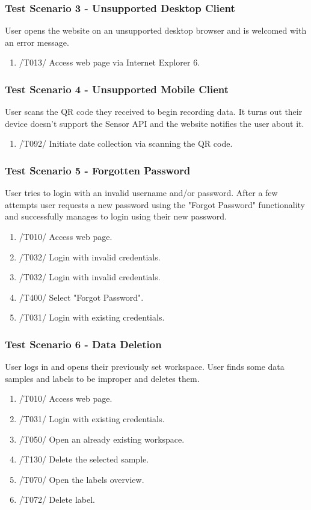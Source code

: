 \subsubsection{Test Scenario 3 - Unsupported Desktop Client}
User opens the website on an unsupported desktop browser and is welcomed with an error message.
\begin{enumerate}
    \item /T013/ Access web page via Internet Explorer 6.
\end{enumerate} 
\subsubsection{Test Scenario 4 - Unsupported Mobile Client}
User scans the QR code they received to begin recording data. It turns out their device doesn't support the Sensor API and the website notifies the user about it.
\begin{enumerate}
    \item /T092/ Initiate date collection via scanning the QR code.
\end{enumerate}
\subsubsection{Test Scenario 5 - Forgotten Password}
User tries to login with an invalid username and/or password. After a few attempts user requests a new password using the "Forgot Password" functionality and successfully manages to login using their new password.
\begin{enumerate}
    \item /T010/ Access web page.
    \item /T032/ Login with invalid credentials.
    \item /T032/ Login with invalid credentials.
    \item /T400/ Select "Forgot Password".
    \item /T031/ Login with existing credentials.
\end{enumerate} 
\subsubsection{Test Scenario 6 - Data Deletion} 
User logs in and opens their previously set workspace. User finds some data samples and labels to be improper and deletes them.
\begin{enumerate}
    \item /T010/ Access web page.
    \item /T031/ Login with existing credentials.
    \item /T050/ Open an already existing workspace.
    \item /T130/ Delete the selected sample.
    \item /T070/ Open the labels overview.
    \item /T072/ Delete label.
\end{enumerate}
